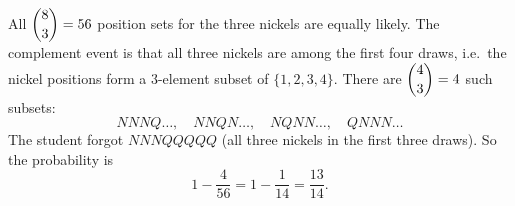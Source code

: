 All $\dbinom83=56$ position sets for the three nickels are equally likely. The complement event is that all three nickels are among the first four draws, i.e.\ the nickel positions form a $3$-element subset of $\{1,2,3,4\}$. There are $\dbinom43=4$ such subsets:
\[NNNQ\ldots,\quad NNQN\ldots,\quad NQNN\ldots,\quad QNNN\ldots\]
The student forgot $NNNQQQQQ$ (all three nickels in the first three draws). So the probability is
\[1-\dfrac{4}{56}=1-\dfrac{1}{14}=\boxed{\dfrac{13}{14}} .\]
